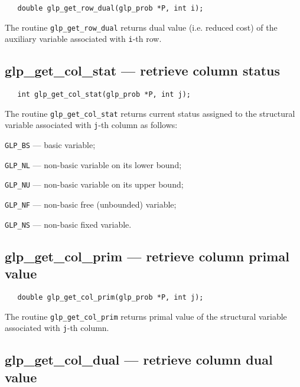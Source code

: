 \synopsis

\begin{verbatim}
   double glp_get_row_dual(glp_prob *P, int i);
\end{verbatim}

\returns

The routine \verb|glp_get_row_dual| returns dual value (i.e. reduced
cost) of the auxiliary variable associated with \verb|i|-th row.

\subsection{glp\_get\_col\_stat --- retrieve column status}

\synopsis

\begin{verbatim}
   int glp_get_col_stat(glp_prob *P, int j);
\end{verbatim}

\returns

The routine \verb|glp_get_col_stat| returns current status assigned to
the structural variable associated with \verb|j|-th column as follows:

\verb|GLP_BS| --- basic variable;

\verb|GLP_NL| --- non-basic variable on its lower bound;

\verb|GLP_NU| --- non-basic variable on its upper bound;

\verb|GLP_NF| --- non-basic free (unbounded) variable;

\verb|GLP_NS| --- non-basic fixed variable.

\subsection{glp\_get\_col\_prim --- retrieve column primal value}

\synopsis

\begin{verbatim}
   double glp_get_col_prim(glp_prob *P, int j);
\end{verbatim}

\returns

The routine \verb|glp_get_col_prim| returns primal value of the
structural variable associated with \verb|j|-th column.

\newpage

\subsection{glp\_get\_col\_dual --- retrieve column dual value}

